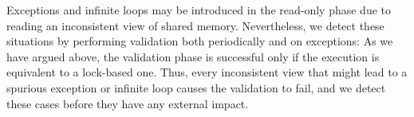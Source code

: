 Exceptions and infinite loops may be introduced in the read-only phase due to reading an inconsistent view of shared memory.
Nevertheless, we detect these situations by performing validation both periodically and on exceptions: As we have argued above,
the validation phase is successful only if the execution is equivalent to a lock-based one. Thus, every inconsistent
view that might lead to a spurious exception or infinite loop causes the validation to fail, and we
detect these cases before they have any external impact. 